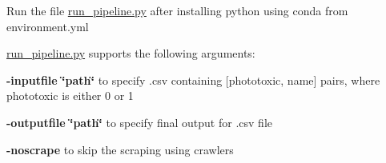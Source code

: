 Run the file \mbox{\hyperlink{run__pipeline_8py}{run\+\_\+pipeline.\+py}} after installing python using conda from environment.\+yml

\mbox{\hyperlink{run__pipeline_8py}{run\+\_\+pipeline.\+py}} supports the following arguments\+:
\begin{DoxyItemize}
\item {\bfseries{-\/inputfile \char`\"{}path\char`\"{}}} to specify .csv containing \mbox{[}phototoxic, name\mbox{]} pairs, where phototoxic is either 0 or 1
\item {\bfseries{-\/outputfile \char`\"{}path\char`\"{}}} to specify final output for .csv file
\item {\bfseries{-\/noscrape}} to skip the scraping using crawlers 
\end{DoxyItemize}